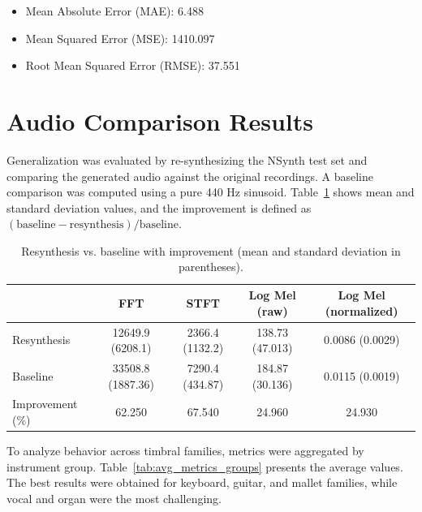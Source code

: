 \begin{itemize}
  \item Mean Absolute Error (MAE): 6.488
  \item Mean Squared Error (MSE): 1410.097
  \item Root Mean Squared Error (RMSE): 37.551
\end{itemize}

\section{Audio Comparison Results}

Generalization was evaluated by re-synthesizing the NSynth test set and comparing the generated audio against the original recordings. A baseline comparison was computed using a pure 440 Hz sinusoid. Table~\ref{tab:metrics} shows mean and standard deviation values, and the improvement is defined as \((\text{baseline} - \text{resynthesis}) / \text{baseline}\).

\begin{table}[htb]
  \centering
  \small
  \caption{Resynthesis vs. baseline with improvement (mean and standard deviation in parentheses).}
  \label{tab:metrics}
  \begin{tabular}{l|c|c|c|c}
    \hline
                     & FFT               & STFT            & Log Mel (raw)   & Log Mel (normalized) \\
    \hline
    Resynthesis      & 12649.9 (6208.1)  & 2366.4 (1132.2) & 138.73 (47.013) & 0.0086 (0.0029)      \\
    Baseline         & 33508.8 (1887.36) & 7290.4 (434.87) & 184.87 (30.136) & 0.0115 (0.0019)      \\
    Improvement (\%) & 62.250            & 67.540          & 24.960          & 24.930               \\
    \hline
  \end{tabular}
\end{table}

To analyze behavior across timbral families, metrics were aggregated by instrument group. Table~\ref{tab:avg_metrics_groups} presents the average values. The best results were obtained for keyboard, guitar, and mallet families, while vocal and organ were the most challenging.

